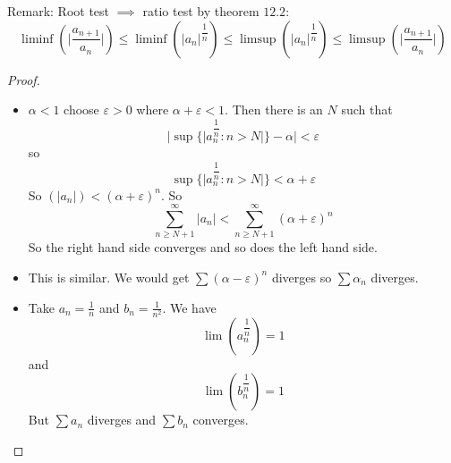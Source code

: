 \documentclass{report}
\begin{document}
Remark: Root test $\implies $ ratio test by theorem $12.2$:
    \begin{equation*}
        \liminf(\lvert \dfrac{a_{n + 1}}{a_{n}} \rvert) \leq \liminf (\lvert a_{n} \rvert^{\dfrac{1}{n}}) \leq \limsup(\lvert a_{n} \rvert^{\dfrac{1}{n}}) \leq \limsup(\lvert \dfrac{a_{n + 1}}{a_{n}} \rvert)
    \end{equation*}

\begin{proof}
    \begin{itemize}
        \item $\alpha <  1$ choose $\varepsilon >  0$ where $\alpha + \varepsilon < 1$. Then there is an $N$ such that 
            \begin{equation*}
                \lvert \sup  \{\lvert a_{n}^{\dfrac{1}{n}} : n > N \rvert\} - \alpha \rvert < \varepsilon
            \end{equation*}
        so
            \begin{equation*}
                \sup \{\lvert a_{n}^{\dfrac{1}{n}} : n > N \rvert\} <   \alpha + \varepsilon
            \end{equation*}
        So $(\lvert a_{n} \rvert) <  (\alpha + \varepsilon)^{n}$. So
            \begin{equation*}
                \sum_{n \geq N + 1}^{\infty} \lvert a_{n} \rvert < \sum_{n \geq N + 1}^{\infty} (\alpha + \varepsilon)^{n}
            \end{equation*}
        So the right hand side converges and so does the left hand side.

        \item This is similar. We would get $\sum (\alpha - \varepsilon)^{n}$ diverges so $\sum \alpha_{n}$ diverges.

        \item Take $a_{n} = \frac{1}{n}$ and $b_{n} = \frac{1}{n^{2}}$. We have
            \begin{equation*}
                \lim(a_{n}^{\dfrac{1}{n}}) = 1
            \end{equation*}
        and 
            \begin{equation*}
                \lim(b_{n}^{\dfrac{1}{n}}) = 1
            \end{equation*}
        But $\sum a_{n}$ diverges and $\sum b_{n}$ converges.
    \end{itemize}
\end{proof}
\end{document}
